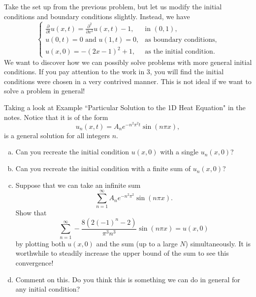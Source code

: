 \documentclass[12pt]{article} %
\begin{document}
\begin{problem}[Bonus]
Take the set up from the previous problem, but let us modify the initial conditions and boundary conditions slightly. Instead, we have
\[
\begin{cases}
\frac{\partial}{\partial t} u(x,t) = \frac{\partial^2}{\partial x^2} u(x,t) - 1, & \textrm{in $(0,1)$},\\
u(0,t)=0 \textrm{~and~} u(1,t)=0, & \text{as boundary conditions},\\
u(x,0) = -(2x-1)^2+1, & \textrm{as the initial condition}.
\end{cases}
\]
We want to discover how we can possibly solve problems with more general initial conditions. If you pay attention to the work in 3, you will find the initial conditions were chosen in a very contrived manner. This is not ideal if we want to solve a problem in general!

Taking a look at Example ``Particular Solution to the 1D Heat Equation" in the notes. Notice that it is of the form
\[
u_n(x,t) = A_ne^{-n^2\pi^2 t} \sin(n \pi x),
\]
is a general solution for all integers $n$. 
\begin{enumerate}[(a)]
    \item Can you recreate the initial condition $u(x,0)$ with a single $u_n(x,0)$?
    \item Can you recreate the initial condition with a finite sum of $u_n(x,0)$?
    \item Suppose that we can take an infinite sum
    \[
    \sum_{n=1}^\infty A_n e^{-n^2\pi^2} \sin(n \pi x).
    \]
    Show that
    \[
    \sum_{n=1}^\infty -\frac{8\left(2\left(-1\right)^{n}-2\right)}{\pi^{3}n^{3}}\sin\left(n\pi x\right) = u(x,0)
    \]
    by plotting both $u(x,0)$ and the sum (up to a large $N$) simultaneously. It is worthwhile to steadily increase the upper bound of the sum to see this convergence!
    \item Comment on this. Do you think this is something we can do in general for any initial condition?
\end{enumerate}
\end{problem}
\end{document}
